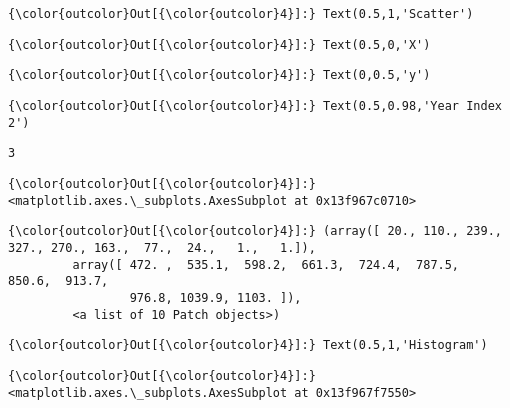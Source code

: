 \documentclass[11pt]{article}
\begin{document}
\begin{Verbatim}[commandchars=\\\{\}]
{\color{outcolor}Out[{\color{outcolor}4}]:} Text(0.5,1,'Scatter')
\end{Verbatim}
            
\begin{Verbatim}[commandchars=\\\{\}]
{\color{outcolor}Out[{\color{outcolor}4}]:} Text(0.5,0,'X')
\end{Verbatim}
            
\begin{Verbatim}[commandchars=\\\{\}]
{\color{outcolor}Out[{\color{outcolor}4}]:} Text(0,0.5,'y')
\end{Verbatim}
            
\begin{Verbatim}[commandchars=\\\{\}]
{\color{outcolor}Out[{\color{outcolor}4}]:} Text(0.5,0.98,'Year Index 2')
\end{Verbatim}
            
    \begin{Verbatim}[commandchars=\\\{\}]
3

    \end{Verbatim}

\begin{Verbatim}[commandchars=\\\{\}]
{\color{outcolor}Out[{\color{outcolor}4}]:} <matplotlib.axes.\_subplots.AxesSubplot at 0x13f967c0710>
\end{Verbatim}
            
\begin{Verbatim}[commandchars=\\\{\}]
{\color{outcolor}Out[{\color{outcolor}4}]:} (array([ 20., 110., 239., 327., 270., 163.,  77.,  24.,   1.,   1.]),
         array([ 472. ,  535.1,  598.2,  661.3,  724.4,  787.5,  850.6,  913.7,
                 976.8, 1039.9, 1103. ]),
         <a list of 10 Patch objects>)
\end{Verbatim}
            
\begin{Verbatim}[commandchars=\\\{\}]
{\color{outcolor}Out[{\color{outcolor}4}]:} Text(0.5,1,'Histogram')
\end{Verbatim}
            
\begin{Verbatim}[commandchars=\\\{\}]
{\color{outcolor}Out[{\color{outcolor}4}]:} <matplotlib.axes.\_subplots.AxesSubplot at 0x13f967f7550>
\end{Verbatim}
            
\end{document}
